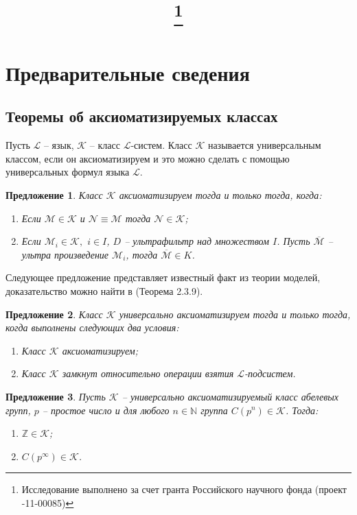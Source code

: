 \documentclass[a4paper,11pt,twoside]{article}
\title{\titles\footnote{Исследование выполнено за счет гранта Российского научного фонда (проект \No 14-11-00085)}}
\author{\authors}
\gdef\firstpage{1}
\newtheorem{proposition}{Предложение}[section]
\def\K{{\mathcal{K}}}
\def\L{{\mathcal{L}}}
\def\Z{{\mathbb{Z}}}
\def\N{{\mathbb{N}}}
\begin{document}
\maketitle

\tableofcontents


\setcounter{page}{\firstpage}
\pagestyle{newpstyle}

\Russian
\sloppy
\rm

\section{Предварительные сведения}

\subsection{Теоремы об аксиоматизируемых классах}

Пусть $\L$ -- язык, $\K$ -- класс $\L$-систем. Класс $\K$ называется универсальным классом, если он аксиоматизируем и это можно сделать с помощью универсальных формул языка $\L$.

\begin{proposition}\label{prop:AxiomClass}
Класс $\K$ аксиоматизируем тогда и только тогда, когда:
\begin{enumerate}
\item Если $\mathcal{M} \in \K$ и $\mathcal{N} \equiv \mathcal{M}$ тогда $\mathcal{N} \in \K$;
\item Если $\mathcal{M}_i \in \K,$ $i \in I$, $D$ -- ультрафильтр над множеством $I$. Пусть $\overline{\mathcal{M}}$ -- ультра произведение $\mathcal{M}_i$, тогда $\overline{\mathcal{M}} \in K$.
\end{enumerate}
\end{proposition}

Следующее предложение представляет известный факт из теории моделей, доказательство можно найти в \cite{DM} (Теорема 2.3.9).
\begin{proposition}\label{prop:AxiomClass2}
Класс $\K$ универсально аксиоматизируем тогда и только тогда, когда выполнены следующих два условия:
\begin{enumerate}
\item Класс $\K$ аксиоматизируем;
\item Класс $\K$ замкнут относительно операции взятия $\L$-подсистем.
\end{enumerate}
\end{proposition}

\begin{proposition}
Пусть $\K$ -- универсально аксиоматизируемый класс абелевых групп, $p$ -- простое число и для любого $n \in \N$ группа $C(p^n) \in \K$. Тогда:
\begin{enumerate}
\item $\Z \in \K$;
\item $C(p^\infty) \in \K$.  
\end{enumerate}
\end{proposition}
\end{document}
